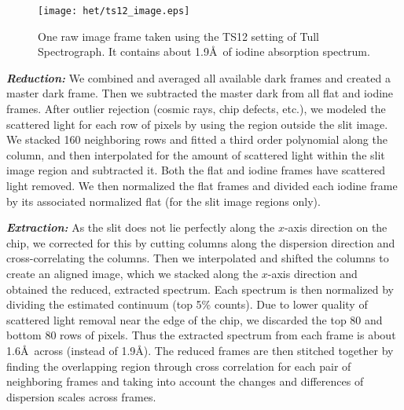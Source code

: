 \begin{figure}
\centering
\texttt{[image: het/ts12\_image.eps]}
\caption{One raw image frame taken using the TS12 setting of Tull
  Spectrograph. It contains about 1.9\AA\ of iodine absorption spectrum. 
\label{het:fig:ts12image}}
\end{figure}


\textbf{\textit{Reduction:}} We combined and averaged all available
dark frames and created a master dark frame. Then we subtracted the
master dark from all flat and iodine frames. After outlier rejection
(cosmic rays, chip defects, etc.), we modeled the scattered light for
each row of pixels by using the region outside the slit image.  We
stacked 160 neighboring rows and fitted a third order polynomial along
the column, and then interpolated for the amount of scattered light
within the slit image region and subtracted it. Both the flat and
iodine frames have scattered light removed. We then normalized the
flat frames and divided each iodine frame by its associated normalized
flat (for the slit image regions only).

\textbf{\textit{Extraction:}} As the slit does not lie perfectly along
the $x$-axis direction on the chip, we corrected for this by cutting
columns along the dispersion direction and cross-correlating the
columns. Then we interpolated and shifted the columns to create an
aligned image, which we stacked along the $x$-axis direction and
obtained the reduced, extracted spectrum. Each spectrum is then
normalized by dividing the estimated continuum (top 5\% counts). Due
to lower quality of scattered light removal near the edge of the chip,
we discarded the top 80 and bottom 80 rows of pixels. Thus the
extracted spectrum from each frame is about 1.6\AA\ across (instead of
1.9\AA). The reduced frames are then stitched together by finding
the overlapping region through cross correlation for each pair of
neighboring frames and taking into account the changes and differences
of dispersion scales across frames.


